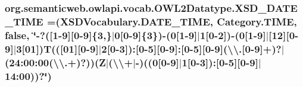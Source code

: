 \hypertarget{enumorg_1_1semanticweb_1_1owlapi_1_1vocab_1_1_o_w_l2_datatype_a73be4f362f3a3b502f4f0a35d5630ecb}{
\subsubsection[{X\-S\-D\-\_\-\-D\-A\-T\-E\-\_\-\-T\-I\-M\-E}]{\setlength{\rightskip}{0pt plus 5cm}org.\-semanticweb.\-owlapi.\-vocab.\-O\-W\-L2\-Datatype.\-X\-S\-D\-\_\-\-D\-A\-T\-E\-\_\-\-T\-I\-M\-E =({\bf X\-S\-D\-Vocabulary.\-D\-A\-T\-E\-\_\-\-T\-I\-M\-E}, {\bf Category.\-T\-I\-M\-E}, false, \char`\"{}-\/?(\mbox{[}1-\/9\mbox{]}\mbox{[}0-\/9\mbox{]}\{3,\}$|$0\mbox{[}0-\/9\mbox{]}\{3\})-\/(0\mbox{[}1-\/9\mbox{]}$|$1\mbox{[}0-\/2\mbox{]})-\/(0\mbox{[}1-\/9\mbox{]}$|$\mbox{[}12\mbox{]}\mbox{[}0-\/9\mbox{]}$|$3\mbox{[}01\mbox{]})T((\mbox{[}01\mbox{]}\mbox{[}0-\/9\mbox{]}$|$2\mbox{[}0-\/3\mbox{]})\-:\mbox{[}0-\/5\mbox{]}\mbox{[}0-\/9\mbox{]}\-:\mbox{[}0-\/5\mbox{]}\mbox{[}0-\/9\mbox{]}(\textbackslash{}\textbackslash{}.\mbox{[}0-\/9\mbox{]}+)?$|$(24\-:00\-:00(\textbackslash{}\textbackslash{}.+)?))(Z$|$(\textbackslash{}\textbackslash{}+$|$-\/)((0\mbox{[}0-\/9\mbox{]}$|$1\mbox{[}0-\/3\mbox{]})\-:\mbox{[}0-\/5\mbox{]}\mbox{[}0-\/9\mbox{]}$|$14\-:00))?\char`\"{})}}\label{enumorg_1_1semanticweb_1_1owlapi_1_1vocab_1_1_o_w_l2_datatype_a73be4f362f3a3b502f4f0a35d5630ecb}
